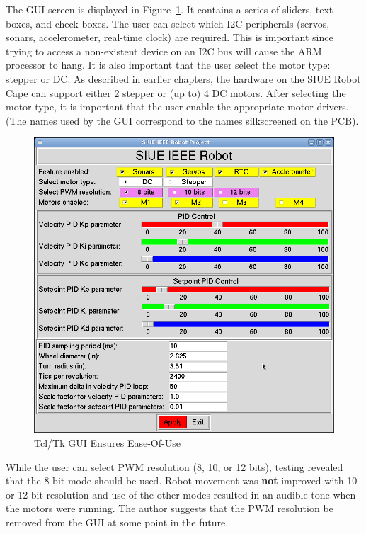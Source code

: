 \documentclass[12pt,oneside,final]{siuethesis}
\theoremstyle{definition}
\begin{document}
The GUI screen is displayed in Figure~\ref{fig:GUI}. It contains a series of sliders, text boxes, and check boxes.  The user can select which I2C peripherals (servos, sonars, accelerometer, real-time clock) are required. This is important since trying to access a non-existent device on an I2C bus will cause the ARM processor to hang. It is also important that the user select the motor type: stepper or DC.  As described in earlier chapters, the hardware on the SIUE Robot Cape can support either 2 stepper or (up to) 4 DC motors. After selecting the motor type, it is important that the user enable the appropriate motor drivers. (The names used by the GUI correspond to the names silkscreened on the PCB).

\begin{figure}[!htbp]
 \centering
 \includegraphics[scale=.5,keepaspectratio=true]{./images/GUI.png}
 \caption{Tcl/Tk GUI Ensures Ease-Of-Use}
 \label{fig:GUI}
\end{figure}

While the user can select PWM resolution (8, 10, or 12 bits), testing revealed that the 8-bit mode should be used. Robot movement was \textbf{not} improved with 10 or 12 bit resolution and use of the other modes resulted in an audible tone when the motors were running. The author suggests that the PWM resolution be removed from the GUI at some point in the future.
\end{document}

